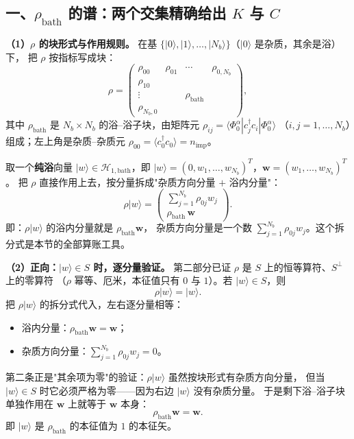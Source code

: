 \documentclass[11pt]{ctexart}
\begin{document}
\subsection{一、$\rho_{\mathrm{bath}}$ 的谱：两个交集精确给出 $K$ 与 $C$}

\textbf{（1）$\rho$ 的块形式与作用规则。}
在基 $\{|0\rangle,|1\rangle,\dots,|N_b\rangle\}$（$|0\rangle$ 是杂质，其余是浴）下，
把 $\rho$ 按指标写成块：
\[
\rho
=
\begin{pmatrix}
\rho_{00} & \rho_{01} & \cdots & \rho_{0,N_b}\\[2pt]
\rho_{10} & & &\\
\vdots & & \rho_{\mathrm{bath}} &\\
\rho_{N_b,0} & & &
\end{pmatrix},
\]
其中 $\rho_{\mathrm{bath}}$ 是 $N_b\times N_b$ 的浴--浴子块，由矩阵元
$\rho_{ij}=\langle\Phi_0^{\alpha}|c_j^{\dagger}c_i|\Phi_0^{\alpha}\rangle$
（$i,j=1,\dots,N_b$）组成；左上角是杂质--杂质元
$\rho_{00}=\langle c_0^{\dagger}c_0\rangle=n_{\mathrm{imp}}$。

取一个\textbf{纯浴}向量 $|w\rangle\in\mathcal{H}_{1,\mathrm{bath}}$，即
$|w\rangle=(0,w_1,\dots,w_{N_b})^T$，$\mathbf{w}=(w_1,\dots,w_{N_b})^T$。
把 $\rho$ 直接作用上去，按分量拆成"杂质方向分量 $+$ 浴内分量"：
\[
\rho|w\rangle
=
\begin{pmatrix}
\sum_{j=1}^{N_b}\rho_{0j}w_j\\[6pt]
\rho_{\mathrm{bath}}\,\mathbf{w}
\end{pmatrix}.
\]
即：$\rho|w\rangle$ 的浴内分量就是 $\rho_{\mathrm{bath}}\mathbf{w}$，
杂质方向分量是一个数 $\sum_{j=1}^{N_b}\rho_{0j}w_j$。这个拆分式是本节的全部算账工具。

\textbf{（2）正向：$|w\rangle\in S$ 时，逐分量验证。}
第二部分已证 $\rho$ 是 $S$ 上的恒等算符、$S^{\perp}$ 上的零算符
（$\rho$ 幂等、厄米，本征值只有 $0$ 与 $1$）。若 $|w\rangle\in S$，则
\[
\rho|w\rangle=|w\rangle.
\]
把 $\rho|w\rangle$ 的拆分式代入，左右逐分量相等：

\begin{itemize}
\item 浴内分量：$\rho_{\mathrm{bath}}\mathbf{w}=\mathbf{w}$；
\item 杂质方向分量：$\sum_{j=1}^{N_b}\rho_{0j}w_j=0$。
\end{itemize}

第二条正是"其余项为零"的验证：$\rho|w\rangle$ 虽然按块形式有杂质方向分量，
但当 $|w\rangle\in S$ 时它必须严格为零——因为右边 $|w\rangle$ 没有杂质分量。
于是剩下浴--浴子块单独作用在 $\mathbf{w}$ 上就等于 $\mathbf{w}$ 本身：
\[
\rho_{\mathrm{bath}}\mathbf{w}=\mathbf{w}.
\]
即 $|w\rangle$ 是 $\rho_{\mathrm{bath}}$ 的本征值为 $1$ 的本征矢。
\end{document}
